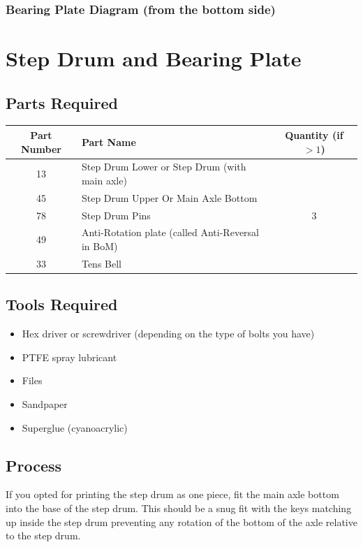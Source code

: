 \documentclass{article}
\begin{document}
\subsubsection{Bearing Plate Diagram (from the bottom side)}



\newpage
\section{Step Drum and Bearing Plate}

\subsection{Parts Required}

\begin{table}[h!]
 \centering
 \begin{tabular}{clc}
    Part Number & Part Name & Quantity (if $>1$) \\ \hline
     13 & Step Drum Lower or Step Drum (with main axle) & \\
     45 & Step Drum Upper Or Main Axle Bottom & \\
     78 & Step Drum Pins & 3 \\
     49 & Anti-Rotation plate (called Anti-Reversal in BoM) & \\
     33 & Tens Bell & 
 \end{tabular}
\end{table}

\subsection{Tools Required}

\begin{itemize}
 \item Hex driver or screwdriver (depending on the type of bolts you have)
 \item PTFE spray lubricant
 \item Files
 \item Sandpaper
 \item Superglue (cyanoacrylic)
\end{itemize}




\subsection{Process}
If you opted for printing the step drum as one piece, fit the main axle bottom into the base of the
step drum. This should be a snug fit with the keys matching up inside the step drum preventing any
rotation of the bottom of the axle relative to the step drum.
\end{document}
